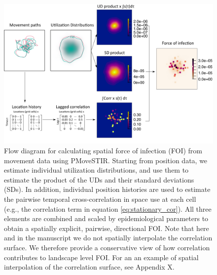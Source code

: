 \documentclass[letterpaper]{article}
\begin{document}
 \begin{figure}
     \includegraphics[width=\textwidth]{figures/steps_diagram.png}
     \caption{Flow diagram for calculating spatial force of infection (FOI) from movement data using PMoveSTIR. Starting from position data, we estimate individual utilization distributions, and use them to estimate the product of the UDs and their standard deviations (SDs). In addition, individual position histories are used to estimate the pairwise temporal cross-correlation in space use at each cell (e.g., the correlation term in equation \ref{eq:stationary_cor}). All three elements are combined and scaled by epidemiological parameters to obtain a spatially explicit, pairwise, directional FOI. Note that here and in the manuscript we do not spatially interpolate the correlation surface. We therefore provide a conservative view of how correlation contributes to landscape level FOI. For an an example of spatial interpolation of the correlation surface, see Appendix X.}
 	\label{fig:steps}
 \end{figure}
\end{document}
